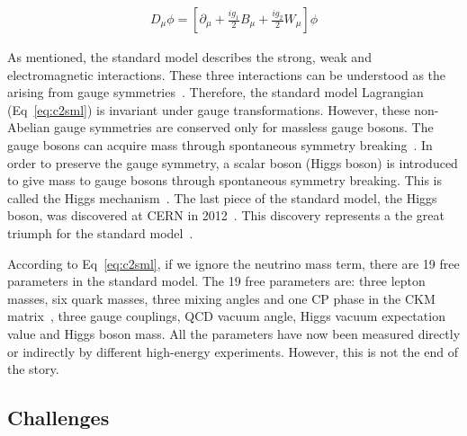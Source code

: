 \begin{equation}
 \begin{aligned}
  D_{\mu}\phi = [\partial_{\mu}+\frac{ig_{1}}{2}B_{\mu}+\frac{ig_{2}}{2}W_{\mu}]\phi
 \end{aligned}
 \label{eq:c2smldh}
\end{equation}

As mentioned, the standard model describes the strong, weak and electromagnetic interactions. These three interactions can be understood as the arising from gauge symmetries~\cite{PhysRev.96.191}. Therefore, the standard model Lagrangian (Eq~\ref{eq:c2sml}) is invariant under gauge transformations. However, these non-Abelian gauge symmetries are conserved only for massless gauge bosons. The gauge bosons can acquire mass through spontaneous symmetry breaking~\cite{PhysRevLett.4.380,PhysRev.122.345,PhysRev.124.246}. In order to preserve the gauge symmetry, a scalar boson (Higgs boson) is introduced to give mass to gauge bosons through spontaneous symmetry breaking. This is called the Higgs mechanism~\cite{PhysRevLett.13.321,PhysRevLett.13.508}. The last piece of the standard model, the Higgs boson, was discovered at CERN in 2012~\cite{Aad:2012tfa,Chatrchyan:2012xdj}. This discovery represents a the great triumph for the standard model~\cite{PhysRevLett.19.1264,PhysRevLett.30.1343,PhysRevLett.30.1346}.

According to Eq~\ref{eq:c2sml}, if we ignore the neutrino mass term, there are 19 free parameters in the standard model. The 19 free parameters are: three lepton masses, six quark masses, three mixing angles and one CP phase in the CKM matrix~\cite{PhysRevLett.10.531,Kobayashi:1973fv}, three gauge couplings, QCD vacuum angle, Higgs vacuum expectation value and Higgs boson mass. All the parameters have now been measured directly or indirectly by different high-energy experiments. However, this is not the end of the story. 

\subsection{Challenges}


